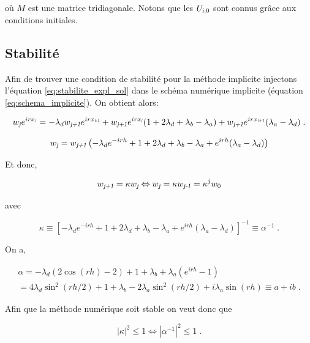\documentclass[a4paper, 12pt]{report}
\begin{document}
où $M$ est une matrice tridiagonale. Notons que les $U_{\textsl{i},0}$ sont connus
grâce aux conditions initiales.

\subsection*{Stabilité}

Afin de trouver une condition de stabilité pour la méthode implicite injectons
l'équation \eqref{eq:stabilite_expl_sol} dans le schéma numérique implicite
(équation \eqref{eq:schema_implicite}). On obtient alors:

\begin{equation}
  w_{\textsl{j}} e^{irx_{\textsl{i}}} = -\lambda_d w_{\textsl{j+1}} e^{irx_{\textsl{i-1}}}
  + w_{\textsl{j+1}} e^{irx_{\textsl{i}}} (1+2 \lambda_d + \lambda_b - \lambda_a)
  +w_{\textsl{j+1}} e^{irx_{\textsl{i+1}}} (\lambda_a - \lambda_d) \;.
\end{equation}

\begin{equation}
  w_{\textsl{j}} = w_{\textsl{j+1}} \left (-\lambda_d e^{-irh} +1 + 2 \lambda_d+\lambda_b-\lambda_a + e^{irh} (\lambda_a - \lambda_d) \right )
\end{equation}

Et donc,

\begin{equation}
  w_{\textsl{j+1}} = \kappa w_{\textsl{j}} \Leftrightarrow w_{\textsl{j}} = \kappa w_{\textsl{j-1}} = \kappa^j w_0
\end{equation}

avec

\begin{equation}
\kappa \equiv \left [ -\lambda_d e^{-irh} +1 + 2 \lambda_d+\lambda_b-\lambda_a + e^{irh} (\lambda_a - \lambda_d) \right ]^{-1} \equiv \alpha^{-1}\;.
\end{equation}

On a,

\begin{multline}
  \alpha = -\lambda_d (2\cos(rh)-2) +1 +\lambda_b+\lambda_a ( e^{irh}-1)\\
  = 4 \lambda_d \sin^2(rh/2) +1 +\lambda_b -2 \lambda_a \sin^2(rh/2) +  i \lambda_a \sin(rh) \equiv a+ib\;.
\end{multline}

Afin que la méthode numérique soit stable on veut donc que

\begin{equation}
  |\kappa|^2 \le 1 \Leftrightarrow |\alpha^{-1}|^2 \le 1\;.
\end{equation}
\end{document}
